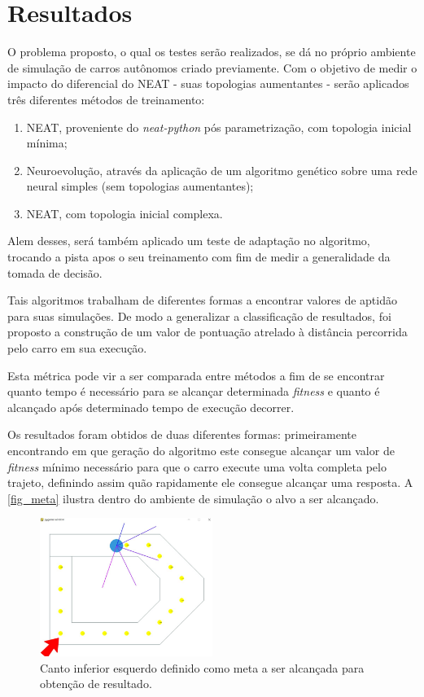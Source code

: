 \chapter{Resultados}

O problema proposto, o qual os testes serão realizados, se dá no próprio
ambiente de simulação de carros autônomos criado previamente. Com o objetivo de
medir o impacto do diferencial do NEAT - suas topologias aumentantes - serão
aplicados tr{\^e}s diferentes m{\'e}todos de treinamento:

\begin{enumerate}
	\item NEAT, proveniente do \textit{neat-python} pós parametrização, com topologia inicial m{\'i}nima;
	\item Neuroevolução, através da aplicação de um algoritmo genético sobre uma rede neural simples (sem topologias aumentantes);
	\item NEAT, com topologia inicial complexa.
\end{enumerate}

Alem desses, ser{\'a} tamb{\'e}m aplicado um teste de adapta{\c c}{\~a}o no
algoritmo, trocando a pista apos o seu treinamento com fim de medir a
generalidade da tomada de decis{\~a}o.

Tais algoritmos trabalham de diferentes formas a encontrar valores de aptidão
para suas simulações. De modo a generalizar a classificação de resultados, foi
proposto a construção de um valor de pontua{\c c}{\~a}o atrelado à distância percorrida pelo
carro em sua execução.

Esta métrica pode vir a ser comparada entre métodos a fim de se encontrar
quanto tempo é necessário para se alcançar determinada \textit{fitness} e quanto é
alcançado após determinado tempo de execução decorrer.

Os resultados foram obtidos de duas diferentes formas: primeiramente
encontrando em que geração do algoritmo este consegue alcançar um valor de
\textit{fitness} mínimo necessário para que o carro execute uma volta completa pelo
trajeto, definindo assim quão rapidamente ele consegue alcançar uma resposta. A
\autoref{fig_meta} ilustra dentro do ambiente de simulação o alvo a ser alcançado.

\begin{figure}[htb]
        \centering
        \caption{\label{fig_meta}Canto inferior esquerdo definido como meta a ser alcançada para obtenção de resultado.}
        \includegraphics[width=0.5\textwidth]{images/meta.png}
\end{figure}

